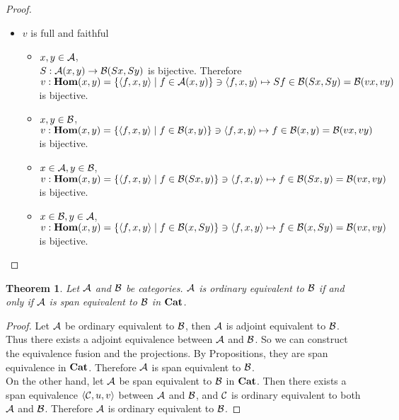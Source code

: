 \documentclass[12pt]{article}
\theoremstyle{plain}
\newtheorem{theorem}{Theorem}[section]
\theoremstyle{definition}
\begin{document}
\begin{proof}
\begin{itemize}
 \item $v$ is full and faithful
 \begin{itemize}
 \item $x,y \in {\cal A}$, \\
$S:{\cal A}{\rm (}x,y{\rm )} \rightarrow {\cal B}{\rm (}Sx,Sy{\rm )}$ is bijective. Therefore $v:{\bf Hom}{\rm (}x,y{\rm )}=\{ \langle f,x,y \rangle \mid f \in {\cal A}(x,y) \} \ni \langle f,x,y \rangle \mapsto Sf \in {\cal B}{\rm (}Sx,Sy{\rm )}={\cal B}{\rm (}vx,vy{\rm )}$ is bijective.
 \item $x,y \in {\cal B}$, \\
$v:{\bf Hom}{\rm (}x,y{\rm )}=\{ \langle f,x,y \rangle \mid f \in {\cal B}(x,y) \} \ni \langle f,x,y \rangle \mapsto f \in {\cal B}{\rm (}x,y{\rm )}={\cal B}{\rm (}vx,vy{\rm )}$ is bijective.
 \item $x \in {\cal A}, y \in {\cal B}$, \\
$v:{\bf Hom}{\rm (}x,y{\rm )}=\{ \langle f,x,y \rangle \mid f \in {\cal B}(Sx,y) \} \ni \langle f,x,y \rangle \mapsto f \in {\cal B}{\rm (}Sx,y{\rm )}={\cal B}{\rm (}vx,vy{\rm )}$ is bijective.
 \item $x \in {\cal B} , y \in {\cal A}$, \\
$v:{\bf Hom}{\rm (}x,y{\rm )}=\{ \langle f,x,y \rangle \mid f \in {\cal B}(x,Sy) \} \ni \langle f,x,y \rangle \mapsto f \in {\cal B}{\rm (}x,Sy{\rm )}={\cal B}{\rm (}vx,vy{\rm )}$ is bijective.
 \end{itemize}
 
\end{itemize}
\end{proof}


\begin{theorem}
Let ${\cal A}$ and ${\cal B}$ be categories. ${\cal A}$ is ordinary equivalent to ${\cal B}$ 
if and only if ${\cal A}$ is span equivalent to ${\cal B}$ in ${\bf Cat}$. 
\end{theorem}

\begin{proof} Let ${\cal A}$ be  ordinary equivalent to ${\cal B}$, then ${\cal A}$ is adjoint equivalent to ${\cal B}$. Thus there exists a adjoint equivalence between ${\cal A}$ and ${\cal B}$. So we can construct the equivalence fusion and the projections. By Propositions, they are span equivalence in ${\bf Cat}$. Therefore ${\cal A}$ is span equivalent to ${\cal B}$. \\
On the other hand, let ${\cal A}$ be span equivalent to ${\cal B}$ in ${\bf Cat}$. Then there exists a span equivalence $\langle {\cal C},u,v \rangle$ between ${\cal A}$ and ${\cal B}$, and ${\cal C}$ is ordinary equivalent to both ${\cal A}$ and ${\cal B}$. Therefore ${\cal A}$ is ordinary equivalent to ${\cal B}$.
\end{proof}
\end{document}
